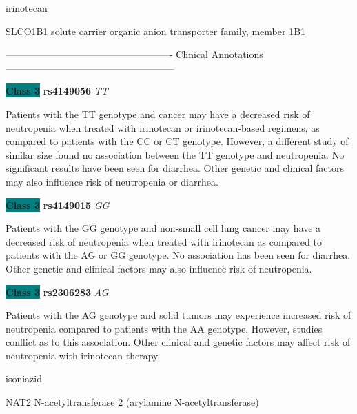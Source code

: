 \documentclass{resume} %
\begin{document}
\begin{rSection}{ irinotecan }
\begin{rSubsection}{ SLCO1B1 }{ solute carrier organic anion transporter family, member 1B1 }{}{}
\item[] ---------------------------------------------------- Clinical Annotations -----------------------------------------------------\newline
\item \textbf{\colorbox{teal} {Class 3}} \textbf{ rs4149056 } \textit{ TT }
\item[] Patients with the TT genotype and cancer may have a decreased risk of neutropenia when treated with irinotecan or irinotecan-based regimens, as compared to patients with the CC or CT genotype. However, a different study of similar size found no association between the TT genotype and neutropenia. No significant results have been seen for diarrhea. Other genetic and clinical factors may also influence risk of neutropenia or diarrhea.\item \textbf{\colorbox{teal} {Class 3}} \textbf{ rs4149015 } \textit{ GG }
\item[] Patients with the GG genotype and non-small cell lung cancer may have a decreased risk of neutropenia when treated with irinotecan as compared to patients with the AG or GG genotype. No association has been seen for diarrhea. Other genetic and clinical factors may also influence risk of neutropenia.\item \textbf{\colorbox{teal} {Class 3}} \textbf{ rs2306283 } \textit{ AG }
\item[] Patients with the AG genotype and solid tumors may experience increased risk of neutropenia compared to patients with the AA genotype. However, studies conflict as to this association. Other clinical and genetic factors may affect risk of neutropenia with irinotecan therapy.
\end{rSubsection}

\end{rSection}\begin{rSection}{ isoniazid }
\item[]

\begin{rSubsection}{ NAT2 }{ N-acetyltransferase 2 (arylamine N-acetyltransferase) }{}{}
\item[]


\end{rSubsection}
\end{rSection}
\end{document}
